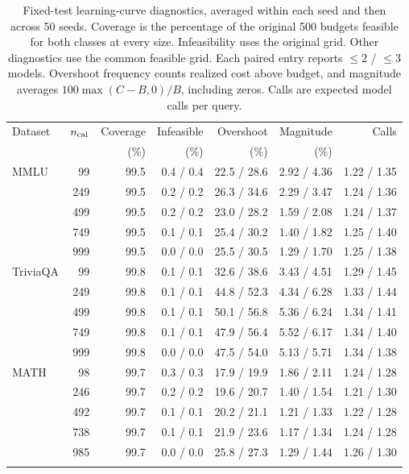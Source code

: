 \begin{table}[htbp]
\centering
\scriptsize
\caption{Fixed-test learning-curve diagnostics, averaged within each seed and then across 50 seeds. Coverage is the percentage of the original 500 budgets feasible for both classes at every size. Infeasibility uses the original grid. Other diagnostics use the common feasible grid. Each paired entry reports $\leq2$ / $\leq3$ models. Overshoot frequency counts realized cost above budget, and magnitude averages $100\max(C-B,0)/B$, including zeros. Calls are expected model calls per query.}
\label{tab:cal_sensitivity}
\begin{tabular}{lrrrrrr}
\toprule
Dataset & $n_{\rm cal}$ & Coverage & Infeasible & Overshoot & Magnitude & Calls \\
 & & (\%) & (\%) & (\%) & (\%) & \\
\midrule
MMLU & 99 & 99.5 & 0.4 / 0.4 & 22.5 / 28.6 & 2.92 / 4.36 & 1.22 / 1.35 \\
 & 249 & 99.5 & 0.2 / 0.2 & 26.3 / 34.6 & 2.29 / 3.47 & 1.24 / 1.36 \\
 & 499 & 99.5 & 0.2 / 0.2 & 23.0 / 28.2 & 1.59 / 2.08 & 1.24 / 1.37 \\
 & 749 & 99.5 & 0.1 / 0.1 & 25.4 / 30.2 & 1.40 / 1.82 & 1.25 / 1.40 \\
 & 999 & 99.5 & 0.0 / 0.0 & 25.5 / 30.5 & 1.29 / 1.70 & 1.25 / 1.38 \\
\addlinespace
TriviaQA & 99 & 99.8 & 0.1 / 0.1 & 32.6 / 38.6 & 3.43 / 4.51 & 1.29 / 1.45 \\
 & 249 & 99.8 & 0.1 / 0.1 & 44.8 / 52.3 & 4.34 / 6.28 & 1.33 / 1.44 \\
 & 499 & 99.8 & 0.1 / 0.1 & 50.1 / 56.8 & 5.36 / 6.24 & 1.34 / 1.41 \\
 & 749 & 99.8 & 0.1 / 0.1 & 47.9 / 56.4 & 5.52 / 6.17 & 1.34 / 1.40 \\
 & 999 & 99.8 & 0.0 / 0.0 & 47.5 / 54.0 & 5.13 / 5.71 & 1.34 / 1.38 \\
\addlinespace
MATH & 98 & 99.7 & 0.3 / 0.3 & 17.9 / 19.9 & 1.86 / 2.11 & 1.24 / 1.28 \\
 & 246 & 99.7 & 0.2 / 0.2 & 19.6 / 20.7 & 1.40 / 1.54 & 1.21 / 1.30 \\
 & 492 & 99.7 & 0.1 / 0.1 & 20.2 / 21.1 & 1.21 / 1.33 & 1.22 / 1.28 \\
 & 738 & 99.7 & 0.1 / 0.1 & 21.9 / 23.6 & 1.17 / 1.34 & 1.24 / 1.28 \\
 & 985 & 99.7 & 0.0 / 0.0 & 25.8 / 27.3 & 1.29 / 1.44 & 1.26 / 1.30 \\
\addlinespace

\end{tabular}
\end{table}
